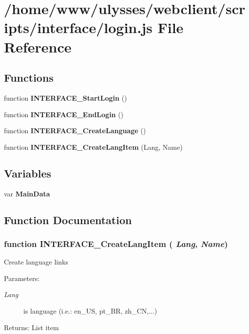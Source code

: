 \section{/home/www/ulysses/webclient/scripts/interface/login.js File Reference}
\label{interface_2login_8js}
\subsection*{Functions}
\begin{CompactItemize}
\item 
function {\bf INTERFACE\_\-StartLogin} ()
\item 
function {\bf INTERFACE\_\-EndLogin} ()
\item 
function {\bf INTERFACE\_\-CreateLanguage} ()
\item 
function {\bf INTERFACE\_\-CreateLangItem} (Lang, Name)
\end{CompactItemize}
\subsection*{Variables}
\begin{CompactItemize}
\item 
var {\bf MainData}
\end{CompactItemize}


\subsection{Function Documentation}
\subsubsection{\setlength{\rightskip}{0pt plus 5cm}function INTERFACE\_\-CreateLangItem ( {\em Lang}, \/   {\em Name})\hspace{0.3cm}{\tt  [private]}}\label{interface_2login_8js_4ba00e3764bd3e83ef908d5edd43d993}


Create language links

\begin{Desc}
\item[Parameters:]
\begin{description}
\item[{\em Lang}]is language (i.e.: en\_\-US, pt\_\-BR, zh\_\-CN,...) \end{description}
\end{Desc}
\begin{Desc}
\item[Returns:]List item \end{Desc}


